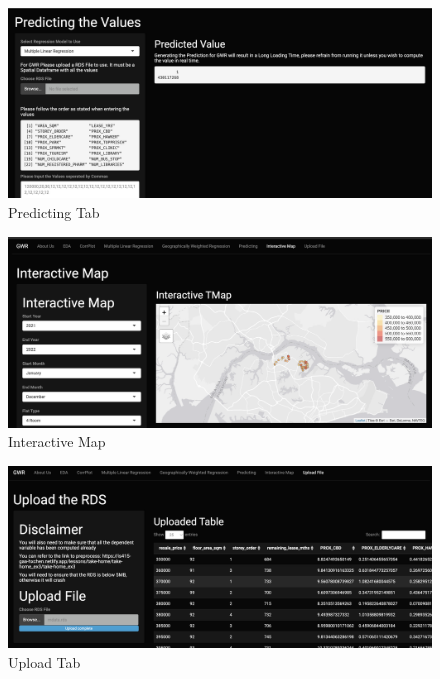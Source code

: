 \documentclass[manuscript,screen]{acmart}
\begin{document}
\begin{figure}

{\centering \includegraphics{images/Screenshot 2023-04-15 at 12.01.01 AM.png}

}

\caption{\label{fig-6}Predicting Tab}

\end{figure}

\begin{figure}

{\centering \includegraphics{images/Screenshot 2023-04-15 at 12.06.50 AM.png}

}

\caption{\label{fig-7}Interactive Map}

\end{figure}

\begin{figure}

{\centering \includegraphics{images/Screenshot 2023-04-14 at 11.20.47 PM.png}

}

\caption{\label{fig-8}Upload Tab}

\end{figure}
\end{document}
